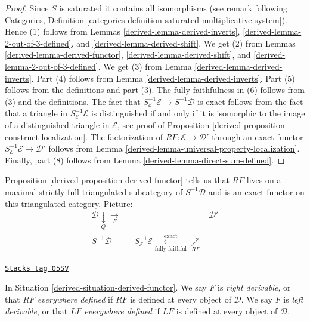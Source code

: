 \begin{proof}

Since $S$ is saturated it contains all isomorphisms (see remark
following Categories, Definition
\ref{categories-definition-saturated-multiplicative-system}).
Hence (1) follows from Lemmas \ref{derived-lemma-derived-inverts},
\ref{derived-lemma-2-out-of-3-defined}, and \ref{derived-lemma-derived-shift}.
We get (2) from Lemmas \ref{derived-lemma-derived-functor}, \ref{derived-lemma-derived-shift},
and \ref{derived-lemma-2-out-of-3-defined}.
We get (3) from Lemma \ref{derived-lemma-derived-inverts}.
Part (4) follows from Lemma \ref{derived-lemma-derived-inverts}.
Part (5) follows from the definitions and part (3).
The fully faithfulness in (6) follows from (3) and
the definitions. The fact that
$S_\mathcal{E}^{-1}\mathcal{E} \to S^{-1}\mathcal{D}$
is exact follows from the fact that a triangle in
$S_\mathcal{E}^{-1}\mathcal{E}$ is distinguished
if and only if it is isomorphic to the image of a
distinguished triangle in $\mathcal{E}$, see proof of
Proposition \ref{derived-proposition-construct-localization}.
The factorization of $RF : \mathcal{E} \to \mathcal{D}'$
through an exact functor $S_\mathcal{E}^{-1}\mathcal{E} \to \mathcal{D}'$
follows from Lemma \ref{derived-lemma-universal-property-localization}.
Finally, part (8) follows from Lemma \ref{derived-lemma-direct-sum-defined}.
\end{proof}

Proposition \ref{derived-proposition-derived-functor}
tells us that $RF$ lives on a maximal strictly full
triangulated subcategory of $S^{-1}\mathcal{D}$ and is an exact functor
on this triangulated category. Picture:
$$
\begin{array}{cccc}\mathcal{D} \underset{Q}{\downarrow}\underset{F}{\longrightarrow} &  &  & \mathcal{D}' \\ S^{-1}\mathcal{D} &  & S_\mathcal{E}^{-1}\mathcal{E}
\overset{\text{exact}}{\underset{\text{fully faithful}}{\longleftarrow}}\underset{RF}{\nearrow} & \end{array}
$$

\begin{definition}
\label{derived-definition-everywhere-defined}
\href{https://stacks.math.columbia.edu/tag/05SV}{\texttt{Stacks tag 05SV}}

In
Situation \ref{derived-situation-derived-functor}.
We say $F$ is {\it right derivable}, or that $RF$ {\it everywhere defined}
if $RF$ is defined at every object of $\mathcal{D}$.
We say $F$ is {\it left derivable}, or that $LF$ {\it everywhere defined}
if $LF$ is defined at every object of $\mathcal{D}$.
\end{definition}

